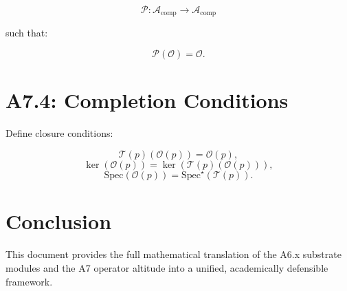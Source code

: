 \[
\mathcal{P} : \mathcal{A}_{\mathrm{comp}} \to \mathcal{A}_{\mathrm{comp}}
\]

such that:

\[
\mathcal{P}(\mathcal{O}) = \mathcal{O}.
\]

\section{A7.4: Completion Conditions}

Define closure conditions:

\[
\mathcal{T}(p)(\mathcal{O}(p)) = \mathcal{O}(p),
\]
\[
\ker(\mathcal{O}(p)) = \ker(\mathcal{T}(p)(\mathcal{O}(p))),
\]
\[
\mathrm{Spec}(\mathcal{O}(p)) = \mathrm{Spec}^\star(\mathcal{T}(p)).
\]

\section{Conclusion}

This document provides the full mathematical translation of the A6.x substrate
modules and the A7 operator altitude into a unified, academically defensible
framework.
